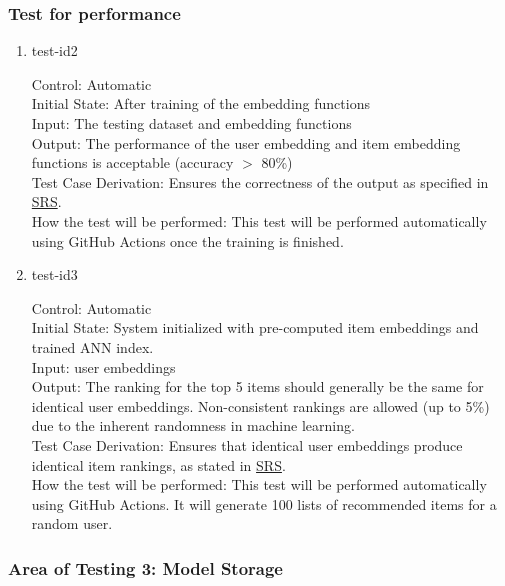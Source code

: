 \documentclass[12pt, titlepage]{article}
\begin{document}
\subsubsection{Test for performance}

\begin{enumerate}
  \item{test-id2\\}

  Control: Automatic\\
  Initial State: After training of the embedding functions\\
  Input: The testing dataset and embedding functions\\
  Output: The performance of the user embedding and item embedding functions is acceptable (accuracy $>$ 80\%)\\
  Test Case Derivation: Ensures the correctness of the output as specified in \href{https://github.com/V-AS/Two-tower-recommender-system/blob/main/docs/SRS/SRS.pdf}{SRS}.\\
  How the test will be performed: This test will be performed automatically using GitHub Actions once the training is finished.

\item{test-id3\\}

Control: Automatic\\
Initial State: System initialized with pre-computed item embeddings and trained ANN index.\\
Input:  user embeddings\\
Output: The ranking for the top 5 items should generally be the same for identical user embeddings. Non-consistent rankings are allowed (up to 5\%) due to the inherent randomness in machine learning.\\
Test Case Derivation: Ensures that identical user embeddings produce identical item rankings, as stated in \href{https://github.com/V-AS/Two-tower-recommender-system/blob/main/docs/SRS/SRS.pdf}{SRS}.\\
How the test will be performed: This test will be performed automatically using GitHub Actions. It will generate 100 lists of recommended items for a random user.\\

\end{enumerate}

\subsubsection{Area of Testing 3: Model Storage}
\end{document}
